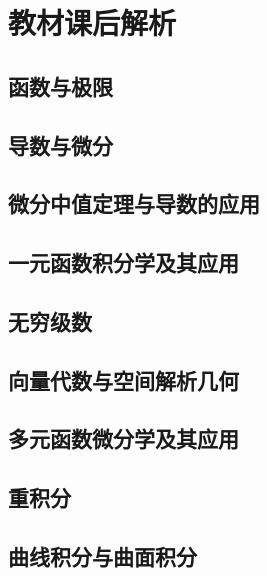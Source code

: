 \documentclass[openany,customfont=true]{HTNotes}
\begin{document}
\maketitle
\makeflypage

\frontmatter
\tableofcontents

\mainmatter
\part{教材课后解析}
  \chapter{函数与极限}
    

  \chapter{导数与微分}
    

  \chapter{微分中值定理与导数的应用}
    

  \chapter{一元函数积分学及其应用}
    

  \chapter{无穷级数}
    

  \chapter{向量代数与空间解析几何}
    

  \chapter{多元函数微分学及其应用}
    

  \chapter{重积分}
    

  \chapter{曲线积分与曲面积分}
    
\end{document}
